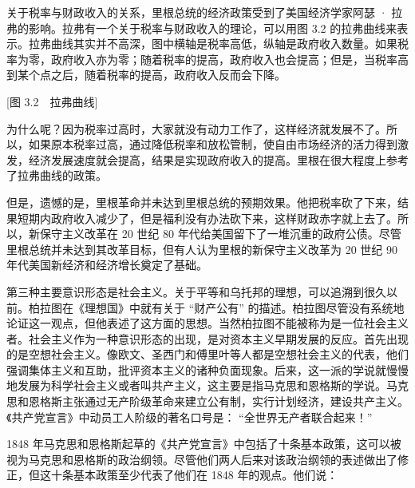 关于税率与财政收入的关系，里根总统的经济政策受到了美国经济学家阿瑟 · 拉弗的影响。拉弗有一个关于税率与财政收入的理论，可以用图 3.2 的拉弗曲线来表示。拉弗曲线其实并不高深，图中横轴是税率高低，纵轴是政府收入数量。如果税率为零，政府收入亦为零；随着税率的提高，政府收入也会提高；但是，当税率高到某个点之后，随着税率的提高，政府收入反而会下降。

[图 3.2　拉弗曲线]

为什么呢？因为税率过高时，大家就没有动力工作了，这样经济就发展不了。所以，如果原本税率过高，通过降低税率和放松管制，使自由市场经济的活力得到激发，经济发展速度就会提高，结果是实现政府收入的提高。里根在很大程度上参考了拉弗曲线的政策。

但是，遗憾的是，里根革命并未达到里根总统的预期效果。他把税率砍了下来，结果短期内政府收入减少了，但是福利没有办法砍下来，这样财政赤字就上去了。所以，新保守主义改革在 20 世纪 80 年代给美国留下了一堆沉重的政府公债。尽管里根总统并未达到其改革目标，但有人认为里根的新保守主义改革为 20 世纪 90 年代美国新经济和经济增长奠定了基础。


第三种主要意识形态是社会主义。关于平等和乌托邦的理想，可以追溯到很久以前。柏拉图在《理想国》中就有关于 “财产公有” 的描述。柏拉图尽管没有系统地论证这一观点，但他表述了这方面的思想。当然柏拉图不能被称为是一位社会主义者。社会主义作为一种意识形态的出现，是对资本主义早期发展的反应。首先出现的是空想社会主义。像欧文、圣西门和傅里叶等人都是空想社会主义的代表，他们强调集体主义和互助，批评资本主义的诸种负面现象。后来，这一派的学说就慢慢地发展为科学社会主义或者叫共产主义，这主要是指马克思和恩格斯的学说。马克思和恩格斯主张通过无产阶级革命来建立公有制，实行计划经济，建设共产主义。《共产党宣言》中动员工人阶级的著名口号是： “全世界无产者联合起来！” 

1848 年马克思和恩格斯起草的《共产党宣言》中包括了十条基本政策，这可以被视为马克思和恩格斯的政治纲领。尽管他们两人后来对该政治纲领的表述做出了修正，但这十条基本政策至少代表了他们在 1848 年的观点。他们说：


